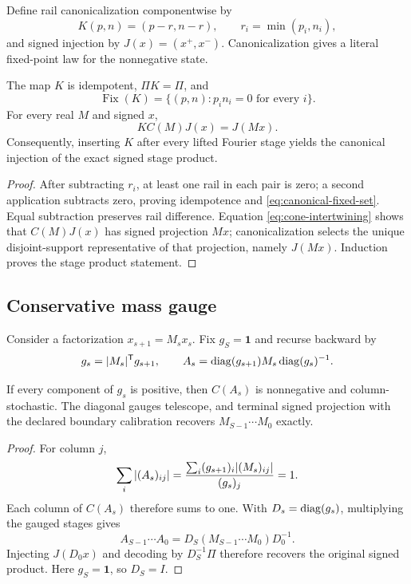 Define rail canonicalization componentwise by
\begin{equation}
 K(p,n)=(p-r,n-r),\qquad r_i=\min(p_i,n_i),
 \label{eq:rail-canonicalization}
\end{equation}
and signed injection by $J(x)=(x^+,x^-)$.  Canonicalization gives a literal
fixed-point law for the nonnegative state.

\begin{theorem}
The map $K$ is idempotent, $\Pi K=\Pi$, and
\begin{equation}
 \operatorname{Fix}(K)=\{(p,n):p_i n_i=0\text{ for every }i\}.
 \label{eq:canonical-fixed-set}
\end{equation}
For every real $M$ and signed $x$,
\begin{equation}
 KC(M)J(x)=J(Mx).
 \label{eq:canonical-stage}
\end{equation}
Consequently, inserting $K$ after every lifted Fourier stage yields the
canonical injection of the exact signed stage product.
\end{theorem}
\begin{proof}
After subtracting $r_i$, at least one rail in each pair is zero; a second
application subtracts zero, proving idempotence and
\eqref{eq:canonical-fixed-set}.  Equal subtraction preserves rail difference.
Equation \eqref{eq:cone-intertwining} shows that $C(M)J(x)$ has signed
projection $Mx$; canonicalization selects the unique disjoint-support
representative of that projection, namely $J(Mx)$.  Induction proves the stage
product statement.
\end{proof}

\subsection{Conservative mass gauge}

Consider a factorization $x_{s+1}=M_sx_s$.  Fix $g_S=\bm{1}$ and recurse backward
by
\begin{equation}
 g_s=|M_s|^{\mathsf{T}}g_{s+1},
 \qquad
 A_s=\operatorname{diag}(g_{s+1})M_s\operatorname{diag}(g_s)^{-1}.
 \label{eq:mass-gauge}
\end{equation}

\begin{theorem}
If every component of $g_s$ is positive, then $C(A_s)$ is nonnegative and
column-stochastic.  The diagonal gauges telescope, and terminal signed
projection with the declared boundary calibration recovers
$M_{S-1}\cdots M_0$ exactly.
\end{theorem}
\begin{proof}
For column $j$,
\[
 \sum_i|(A_s)_{ij}|=
 {\sum_i(g_{s+1})_i|(M_s)_{ij}|\over(g_s)_j}=1.
\]
Each column of $C(A_s)$ therefore sums to one.  With
$D_s=\operatorname{diag}(g_s)$, multiplying the gauged stages gives
\begin{equation}
 A_{S-1}\cdots A_0=D_S(M_{S-1}\cdots M_0)D_0^{-1}.
 \label{eq:mass-boundary-product}
\end{equation}
Injecting $J(D_0x)$ and decoding by $D_S^{-1}\Pi$ therefore recovers the
original signed product.  Here $g_S=\bm{1}$, so $D_S=I$.
\end{proof}

